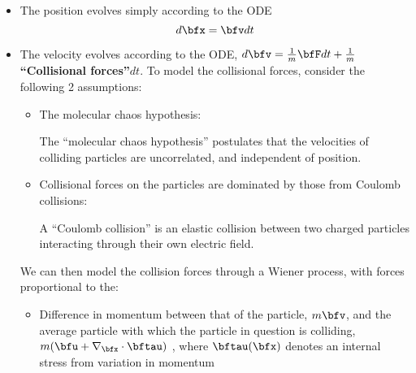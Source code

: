     \begin{itemize}
        \item  The position evolves simply according to the ODE
        \begin{equation}\label{eqn:velocity ODE}
            d\bfx  =  \bfv dt
        \end{equation}
        \item  The velocity evolves according to the ODE, $d\bfv  =  \frac{1}{m}\bfF dt + \frac{1}{m}${\bf ``Collisional forces''}$dt$.  To model the collisional forces, consider the following 2 assumptions:
        \begin{itemize}
            \item  The molecular chaos hypothesis:
            \begin{definition}
                The ``molecular chaos hypothesis'' postulates that the velocities of colliding particles are uncorrelated, and independent of position. \BA{[Ref]} 
            \end{definition}
            \item  Collisional forces on the particles are dominated by those from Coulomb collisions: 
            \begin{definition}
                A ``Coulomb collision'' is an elastic collision between two charged particles interacting through their own electric field. \BA{[Ref]} 
            \end{definition}
        \end{itemize}
        We can then model the collision forces through a Wiener process, with forces proportional to the:  
        \begin{itemize}
            \item  Difference in momentum between that of the particle, $m\bfv$, and the average particle with which the particle in question is colliding, $m(\bfu + \nabla_{\bfx}\cdot\bftau)$ , where $\bftau(\bfx)$ denotes an internal stress from variation in momentum   

\end{itemize}
\end{itemize}
